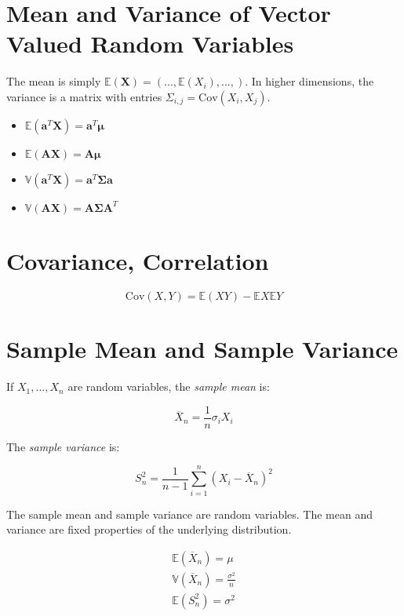 \section{Mean and Variance of Vector Valued Random Variables}
The mean is simply $\mathbb{E}(\mathbf{X}) = (...,\mathbb{E}(X_i),...,) $. In higher dimensions, the variance is a matrix with entries $\Sigma_{i,j}= \mathrm{Cov}(X_i,X_j)$. 

\begin{itemize}
\item $\mathbb{E}(\mathbf{a}^T \mathbf{X}) = \mathbf{a}^T\mathbf{\mu}$
\item $\mathbb{E}(\mathbf{A}\mathbf{X}) = \mathbf{A\mu}$
\item $\mathbb{V}(\mathbf{a}^T \mathbf{X}) = \mathbf{a}^T\mathbf{\Sigma}\mathbf{a}$
\item $\mathbb{V}(\mathbf{AX}) = \mathbf{A\Sigma A}^T$
\end{itemize}

\section{Covariance, Correlation}
\begin{equation}
\mathrm{Cov}(X,Y) = \mathbb{E}(XY) - \mathbb{E}X\mathbb{E}Y
\end{equation}



\section{Sample Mean and Sample Variance}
If $X_1,...,X_n$ are random variables, the \textit{sample mean} is:

\begin{equation}
\overline{X}_n = \frac{1}{n}\sigma_i X_i
\end{equation}

The \textit{sample variance} is:

\begin{equation}
S^2_n = \frac{1}{n-1} \sum^n_{i=1} (X_i - \overline{X}_n)^2
\end{equation}

The sample mean and sample variance are random variables. The mean and variance are fixed properties of the underlying distribution.

\begin{equation}
\begin{array}{l}
\mathbb{E}(\overline{X}_n) = \mu\\
\mathbb{V}(\overline{X}_n) = \frac{\sigma^2}{n}\\
\mathbb{E}(S_n^2) = \sigma^2\\
\end{array}
\end{equation}


